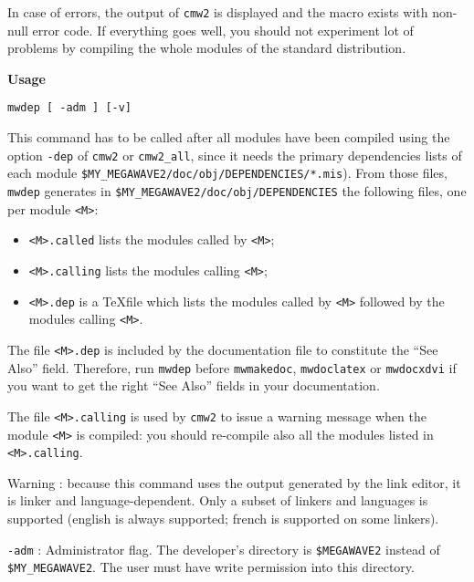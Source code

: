 In case of errors, the output of \verb+cmw2+ is displayed and the macro exists with 
non-null error code.
If everything goes well, you should not experiment lot of problems by compiling
the whole modules of the standard distribution.

\Next

\newpage

{\Large\bf Usage} \bigskip

\verb+mwdep [ -adm ] [-v]+

\Next

\Description
This command has to be called after all modules have been compiled using the option
\verb+-dep+ of \verb+cmw2+ or \verb+cmw2_all+, since it needs the primary dependencies lists of each module 
\newline
\verb+$MY_MEGAWAVE2/doc/obj/DEPENDENCIES/*.mis+). 
From those files, \verb+mwdep+ generates in 
\newline
\verb+$MY_MEGAWAVE2/doc/obj/DEPENDENCIES+ the following files, one per module \verb+<M>+:
\begin{itemize}
\item \verb+<M>.called+ lists the modules called by \verb+<M>+;
\item \verb+<M>.calling+ lists the modules calling \verb+<M>+;
\item \verb+<M>.dep+ is a \TeX file which lists the modules called by \verb+<M>+ followed
by the modules calling \verb+<M>+. 
\end{itemize}

The file \verb+<M>.dep+ is included by the documentation file to constitute the ``See Also'' field.
Therefore, run \verb+mwdep+ before \verb+mwmakedoc+,
\verb+mwdoclatex+ or \verb+mwdocxdvi+ if you want to get the right ``See Also'' fields in your documentation.

The file \verb+<M>.calling+ is used by \verb+cmw2+ to issue a warning message when the
module \verb+<M>+ is compiled: you should re-compile also all the modules listed in
\verb+<M>.calling+. 

Warning : because this command uses the output generated by the link editor, it is 
linker and language-dependent. Only a subset of linkers and languages is supported
(english is always supported; french is supported on some linkers).
\Next

\Options

\verb+-adm+ :  Administrator flag. The developer's directory is \verb+$MEGAWAVE2+ instead of \verb+$MY_MEGAWAVE2+. The user must have write permission into this directory.

